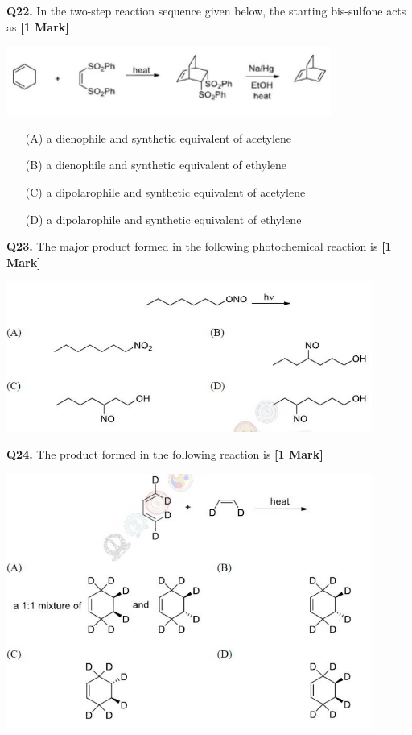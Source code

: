 \documentclass[11pt]{article}
\newcommand{\questiona}[2]{
    \noindent\textbf{Q#2.} #1 \hfill \textbf{[1 Mark]}
}
\begin{document}
\vspace{0.5cm}

\questiona{In the two-step reaction sequence given below, the starting bis-sulfone acts as}{22}
\begin{center}
\includegraphics[width=0.8\textwidth]{figures/22.png}
\end{center}
\begin{enumerate}
    \item[(A)] a dienophile and synthetic equivalent of acetylene
    \item[(B)] a dienophile and synthetic equivalent of ethylene
    \item[(C)] a dipolarophile and synthetic equivalent of acetylene
    \item[(D)] a dipolarophile and synthetic equivalent of ethylene
\end{enumerate}
\vspace{0.5cm}

\questiona{The major product formed in the following photochemical reaction is}{23}
\begin{center}
\includegraphics[width=0.9\textwidth]{figures/23.png}
\end{center}
\vspace{0.5cm}

\questiona{The product formed in the following reaction is}{24}
\begin{center}
\includegraphics[width=0.9\textwidth]{figures/24.png}
\end{center}
\vspace{0.5cm}
\end{document}
